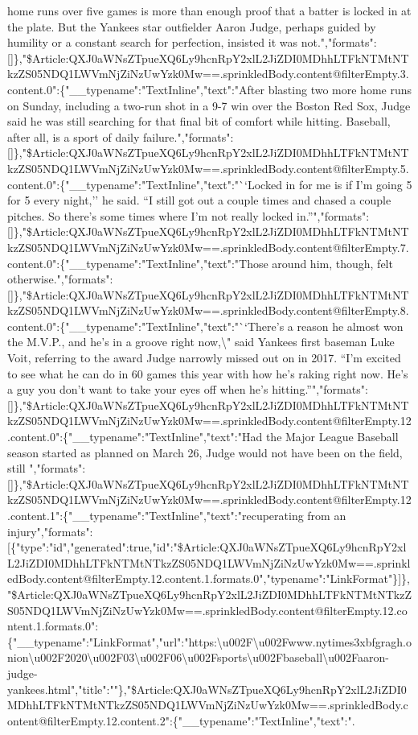 home runs over five games is more than enough proof that a batter is
locked in at the plate. But the Yankees star outfielder Aaron Judge,
perhaps guided by humility or a constant search for perfection, insisted
it was
not.","formats":{[}{]}\},"\$Article:QXJ0aWNsZTpueXQ6Ly9hcnRpY2xlL2JiZDI0MDhhLTFkNTMtNTkzZS05NDQ1LWVmNjZiNzUwYzk0Mw==.sprinkledBody.content@filterEmpty.3.content.0":\{"\_\_typename":"TextInline","text":"After
blasting two more home runs on Sunday, including a two-run shot in a 9-7
win over the Boston Red Sox, Judge said he was still searching for that
final bit of comfort while hitting. Baseball, after all, is a sport of
daily
failure.","formats":{[}{]}\},"\$Article:QXJ0aWNsZTpueXQ6Ly9hcnRpY2xlL2JiZDI0MDhhLTFkNTMtNTkzZS05NDQ1LWVmNjZiNzUwYzk0Mw==.sprinkledBody.content@filterEmpty.5.content.0":\{"\_\_typename":"TextInline","text":"``Locked
in for me is if I'm going 5 for 5 every night,'' he said. ``I still got
out a couple times and chased a couple pitches. So there's some times
where I'm not really locked
in.''","formats":{[}{]}\},"\$Article:QXJ0aWNsZTpueXQ6Ly9hcnRpY2xlL2JiZDI0MDhhLTFkNTMtNTkzZS05NDQ1LWVmNjZiNzUwYzk0Mw==.sprinkledBody.content@filterEmpty.7.content.0":\{"\_\_typename":"TextInline","text":"Those
around him, though, felt
otherwise.","formats":{[}{]}\},"\$Article:QXJ0aWNsZTpueXQ6Ly9hcnRpY2xlL2JiZDI0MDhhLTFkNTMtNTkzZS05NDQ1LWVmNjZiNzUwYzk0Mw==.sprinkledBody.content@filterEmpty.8.content.0":\{"\_\_typename":"TextInline","text":"``There's
a reason he almost won the M.V.P., and he's in a groove right
now,\textbackslash{}" said Yankees first baseman Luke Voit, referring to
the award Judge narrowly missed out on in 2017. ``I'm excited to see
what he can do in 60 games this year with how he's raking right now.
He's a guy you don't want to take your eyes off when he's
hitting.''","formats":{[}{]}\},"\$Article:QXJ0aWNsZTpueXQ6Ly9hcnRpY2xlL2JiZDI0MDhhLTFkNTMtNTkzZS05NDQ1LWVmNjZiNzUwYzk0Mw==.sprinkledBody.content@filterEmpty.12.content.0":\{"\_\_typename":"TextInline","text":"Had
the Major League Baseball season started as planned on March 26, Judge
would not have been on the field, still
","formats":{[}{]}\},"\$Article:QXJ0aWNsZTpueXQ6Ly9hcnRpY2xlL2JiZDI0MDhhLTFkNTMtNTkzZS05NDQ1LWVmNjZiNzUwYzk0Mw==.sprinkledBody.content@filterEmpty.12.content.1":\{"\_\_typename":"TextInline","text":"recuperating
from an
injury","formats":{[}\{"type":"id","generated":true,"id":"\$Article:QXJ0aWNsZTpueXQ6Ly9hcnRpY2xlL2JiZDI0MDhhLTFkNTMtNTkzZS05NDQ1LWVmNjZiNzUwYzk0Mw==.sprinkledBody.content@filterEmpty.12.content.1.formats.0","typename":"LinkFormat"\}{]}\},"\$Article:QXJ0aWNsZTpueXQ6Ly9hcnRpY2xlL2JiZDI0MDhhLTFkNTMtNTkzZS05NDQ1LWVmNjZiNzUwYzk0Mw==.sprinkledBody.content@filterEmpty.12.content.1.formats.0":\{"\_\_typename":"LinkFormat","url":"https:\textbackslash{}u002F\textbackslash{}u002Fwww.nytimes3xbfgragh.onion\textbackslash{}u002F2020\textbackslash{}u002F03\textbackslash{}u002F06\textbackslash{}u002Fsports\textbackslash{}u002Fbaseball\textbackslash{}u002Faaron-judge-yankees.html","title":""\},"\$Article:QXJ0aWNsZTpueXQ6Ly9hcnRpY2xlL2JiZDI0MDhhLTFkNTMtNTkzZS05NDQ1LWVmNjZiNzUwYzk0Mw==.sprinkledBody.content@filterEmpty.12.content.2":\{"\_\_typename":"TextInline","text":".
